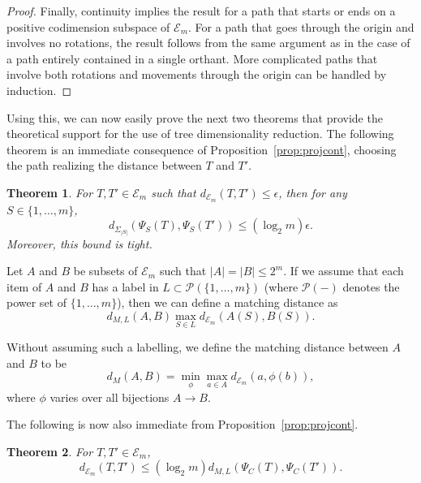 \documentclass[a4paper,11pt]{article}
\newtheorem{theorem}{Theorem}
\newcommand{\aE}{\mathcal{E}}
\newcommand{\aP}{\mathcal{P}}
\begin{document}
\begin{proof}
Finally, continuity implies the result for a path that starts or ends on a positive codimension subspace of $\aE_m$.
For a path that goes through the origin and involves no rotations, the result follows from the same argument as in the case of a path entirely contained in a single orthant.
More complicated paths that involve both rotations and movements through the origin can be handled by induction.
\end{proof}

Using this, we can now easily prove the next two theorems that provide the theoretical support for the use of tree dimensionality reduction.
The following theorem is an immediate consequence of Proposition~\ref{prop:projcont}, choosing the path realizing the distance between $T$ and $T'$.

\begin{theorem}
For $T,T' \in \aE_m$ such that $d_{\aE_m}(T,T') \leq \epsilon$, then for any $S \in \{1,\ldots,m\}$,
\[
d_{\Sigma_{|S|}}(\Psi_S(T), \Psi_S(T')) \leq (\log_2 m)\epsilon.
\]
Moreover, this bound is tight.
\end{theorem}

Let $A$ and $B$ be subsets of $\aE_m$ such that $|A| = |B| \leq 2^m$.
If we assume that each item of $A$ and $B$ has a label in $L \subset \aP(\{1,\ldots,m\})$ (where $\aP(-)$ denotes the power set of $\{1,\ldots,m\}$), then we can define a matching distance as
\[
d_{M,L}(A,B) \max_{S \in L} d_{\aE_m}(A(S), B(S)).
\]

Without assuming such a labelling, we define the matching distance between $A$ and $B$ to be 
\[
d_M(A,B) = \min_{\phi} \max_{a \in A} d_{\aE_m}(a,\phi(b)),
\]
where $\phi$ varies over all bijections $A \to B$.

The following is now also immediate from Proposition~\ref{prop:projcont}.

\begin{theorem}\label{thm:converse}
For $T, T' \in \aE_m$, 
\[
d_{\aE_m}(T,T') \leq (\log_2 m) d_{M,L}(\Psi_C(T), \Psi_C(T')).
\]
\end{theorem}
\end{document}
